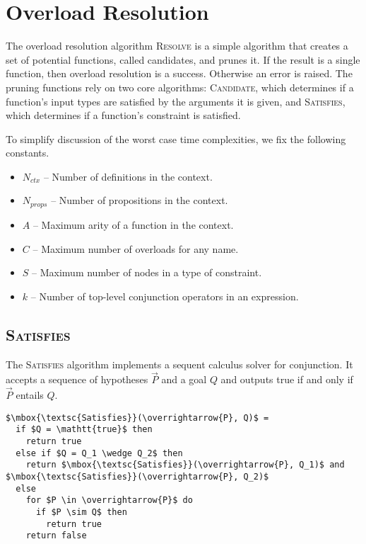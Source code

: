 \section{Overload Resolution}
\label{sec:algos}

The overload resolution algorithm \textsc{Resolve} is a simple algorithm that creates a set of potential functions, called candidates, and prunes it. If the result is a single function, then overload resolution is a success. Otherwise an error is raised. The pruning functions rely on two core algorithms: \textsc{Candidate}, which determines if a function's input types are satisfied by the arguments it is given, and \textsc{Satisfies}, which determines if a function's constraint is satisfied.

To simplify discussion of the worst case time complexities, we fix the following constants.
  \begin{itemize}
    \item
      $N_{ctx}$ -- Number of definitions in the context.
    \item
      $N_{props}$ -- Number of propositions in the context.
    \item
      $A$ -- Maximum arity of a function in the context.
    \item
      $C$ -- Maximum number of overloads for any name.
    \item
      $S$ -- Maximum number of nodes in a type of constraint.
    \item
      $k$ -- Number of top-level conjunction operators in an expression.
  \end{itemize}

\subsection{\textsc{Satisfies}}
\label{subsec:algos.satisfies}

The \textsc{Satisfies} algorithm implements a sequent calculus solver for conjunction. It accepts a sequence of hypotheses $\overrightarrow{P}$ and a goal $Q$ and outputs true if and only if $\overrightarrow{P}$ entails $Q$.

 \begin{center}
    \begin{lstlisting}[style=numberedalgo, mathescape]
$\mbox{\textsc{Satisfies}}(\overrightarrow{P}, Q)$ =
  if $Q = \mathtt{true}$ then
    return true
  else if $Q = Q_1 \wedge Q_2$ then
    return $\mbox{\textsc{Satisfies}}(\overrightarrow{P}, Q_1)$ and $\mbox{\textsc{Satisfies}}(\overrightarrow{P}, Q_2)$
  else
    for $P \in \overrightarrow{P}$ do
      if $P \sim Q$ then
        return true
    return false
    \end{lstlisting}
 \end{center}

